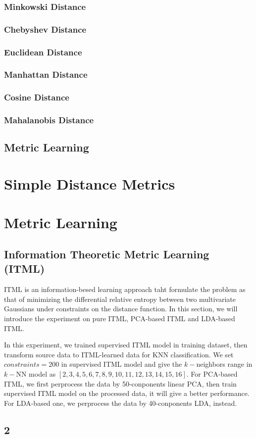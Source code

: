 \documentclass[conference]{IEEEtran}
\begin{document}
\subsubsection{Minkowski Distance}
\subsubsection{Chebyshev Distance}
\subsubsection{Euclidean Distance}
\subsubsection{Manhattan Distance}
\subsubsection{Cosine Distance}
\subsubsection{Mahalanobis Distance}
\subsection{Metric Learning}
\section{Simple Distance Metrics}
\section{Metric Learning}
\subsection{Information Theoretic Metric Learning (ITML)}
ITML is an information-besed learning approach taht formulate the problem as that of minimizing the differential relative entropy between two multivariate Gaussians under constraints on the distance function\cite{Davis2007Information}. In this section, we will introduce the experiment on pure ITML, PCA-based ITML and LDA-based ITML.

In this experiment, we trained supervised ITML model in training dataset, then transform source data to ITML-learned data for KNN classification. We set $constraints=200$ in supervised ITML model and give the $k-$neighbors range in $k-$NN model as $[2, 3, 4, 5, 6, 7, 8, 9, 10, 11, 12, 13, 14, 15, 16]$. For PCA-based ITML, we first perprocess the data by 50-conponents linear PCA, then train supervised ITML model on the processed data, it will give a better performance. For LDA-based one, we perprocess the data by 40-conponents LDA, instead.
\subsection{2}

\end{document}
